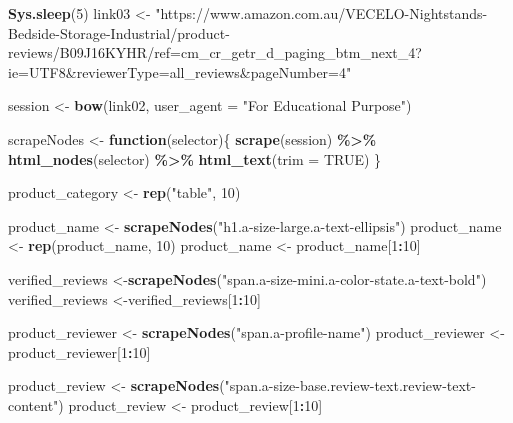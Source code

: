 \documentclass[
]{article}
\newenvironment{Shaded}{\begin{snugshade}}{\end{snugshade}}
\newcommand{\AttributeTok}[1]{\textcolor[rgb]{0.13,0.29,0.53}{#1}}
\newcommand{\ConstantTok}[1]{\textcolor[rgb]{0.56,0.35,0.01}{#1}}
\newcommand{\ControlFlowTok}[1]{\textcolor[rgb]{0.13,0.29,0.53}{\textbf{#1}}}
\newcommand{\DecValTok}[1]{\textcolor[rgb]{0.00,0.00,0.81}{#1}}
\newcommand{\FunctionTok}[1]{\textcolor[rgb]{0.13,0.29,0.53}{\textbf{#1}}}
\newcommand{\NormalTok}[1]{#1}
\newcommand{\OtherTok}[1]{\textcolor[rgb]{0.56,0.35,0.01}{#1}}
\newcommand{\SpecialCharTok}[1]{\textcolor[rgb]{0.81,0.36,0.00}{\textbf{#1}}}
\newcommand{\StringTok}[1]{\textcolor[rgb]{0.31,0.60,0.02}{#1}}
\begin{document}
\begin{Shaded}
\begin{Highlighting}[]
   \FunctionTok{Sys.sleep}\NormalTok{(}\DecValTok{5}\NormalTok{)}
\NormalTok{link03 }\OtherTok{\textless{}{-}} \StringTok{"https://www.amazon.com.au/VECELO{-}Nightstands{-}Bedside{-}Storage{-}Industrial/product{-}reviews/B09J16KYHR/ref=cm\_cr\_getr\_d\_paging\_btm\_next\_4?ie=UTF8\&reviewerType=all\_reviews\&pageNumber=4"}


\NormalTok{  session }\OtherTok{\textless{}{-}} \FunctionTok{bow}\NormalTok{(link02,}
               \AttributeTok{user\_agent =} \StringTok{"For Educational Purpose"}\NormalTok{)}

\NormalTok{  scrapeNodes }\OtherTok{\textless{}{-}} \ControlFlowTok{function}\NormalTok{(selector)\{}
    \FunctionTok{scrape}\NormalTok{(session) }\SpecialCharTok{\%\textgreater{}\%}
      \FunctionTok{html\_nodes}\NormalTok{(selector) }\SpecialCharTok{\%\textgreater{}\%}
      \FunctionTok{html\_text}\NormalTok{(}\AttributeTok{trim =} \ConstantTok{TRUE}\NormalTok{)}
\NormalTok{  \}}

\NormalTok{  product\_category }\OtherTok{\textless{}{-}} \FunctionTok{rep}\NormalTok{(}\StringTok{"table"}\NormalTok{, }\DecValTok{10}\NormalTok{)}

\NormalTok{  product\_name }\OtherTok{\textless{}{-}} \FunctionTok{scrapeNodes}\NormalTok{(}\StringTok{"h1.a{-}size{-}large.a{-}text{-}ellipsis"}\NormalTok{)}
\NormalTok{  product\_name }\OtherTok{\textless{}{-}} \FunctionTok{rep}\NormalTok{(product\_name, }\DecValTok{10}\NormalTok{)}
\NormalTok{  product\_name }\OtherTok{\textless{}{-}}\NormalTok{ product\_name[}\DecValTok{1}\SpecialCharTok{:}\DecValTok{10}\NormalTok{]}
  
\NormalTok{  verified\_reviews }\OtherTok{\textless{}{-}}\FunctionTok{scrapeNodes}\NormalTok{(}\StringTok{"span.a{-}size{-}mini.a{-}color{-}state.a{-}text{-}bold"}\NormalTok{)}
\NormalTok{  verified\_reviews }\OtherTok{\textless{}{-}}\NormalTok{verified\_reviews[}\DecValTok{1}\SpecialCharTok{:}\DecValTok{10}\NormalTok{]}
  
\NormalTok{  product\_reviewer }\OtherTok{\textless{}{-}} \FunctionTok{scrapeNodes}\NormalTok{(}\StringTok{"span.a{-}profile{-}name"}\NormalTok{)}
\NormalTok{  product\_reviewer }\OtherTok{\textless{}{-}}\NormalTok{ product\_reviewer[}\DecValTok{1}\SpecialCharTok{:}\DecValTok{10}\NormalTok{]}
  
\NormalTok{  product\_review }\OtherTok{\textless{}{-}} \FunctionTok{scrapeNodes}\NormalTok{(}\StringTok{"span.a{-}size{-}base.review{-}text.review{-}text{-}content"}\NormalTok{)}
\NormalTok{  product\_review }\OtherTok{\textless{}{-}}\NormalTok{ product\_review[}\DecValTok{1}\SpecialCharTok{:}\DecValTok{10}\NormalTok{]}
  

\end{Highlighting}
\end{Shaded}
\end{document}
